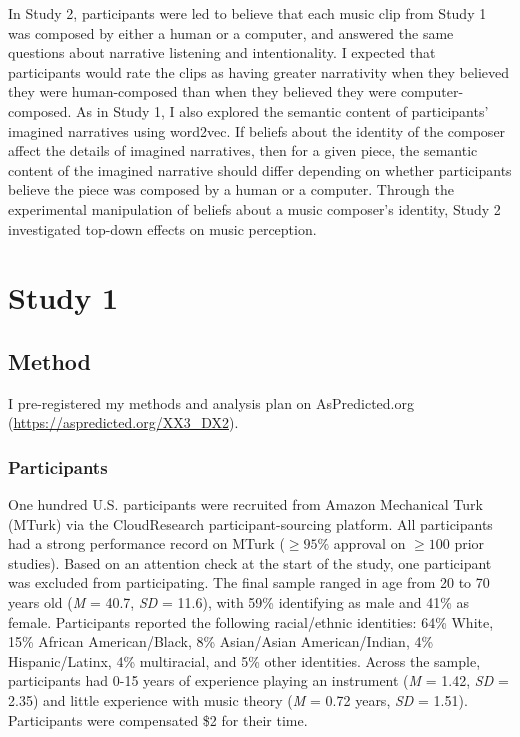 \documentclass[12pt,twoside]{reedthesis}
\begin{document}
In Study 2, participants were led to believe that each music clip from Study 1 was composed by either a human or a computer, and answered the same questions about narrative listening and intentionality. I expected that participants would rate the clips as having greater narrativity when they believed they were human-composed than when they believed they were computer-composed. As in Study 1, I also explored the semantic content of participants’ imagined narratives using word2vec. If beliefs about the identity of the composer affect the details of imagined narratives, then for a given piece, the semantic content of the imagined narrative should differ depending on whether participants believe the piece was composed by a human or a computer. Through the experimental manipulation of beliefs about a music composer’s identity, Study 2 investigated top-down effects on music perception.  

\chapter*{Study 1}

\section{Method}

I pre-registered my methods and analysis plan on AsPredicted.org (\url{https://aspredicted.org/XX3_DX2}).

\subsection{Participants}
One hundred U.S. participants were recruited from Amazon Mechanical Turk (MTurk) via the CloudResearch participant-sourcing platform. All participants had a strong performance record on MTurk ($\ge95\%$ approval on $\ge100$ prior studies). Based on an attention check at the start of the study, one participant was excluded from participating. The final sample ranged in age from 20 to 70 years old (\emph{M} = 40.7, \emph{SD} = 11.6), with 59\% identifying as male and 41\% as female. Participants reported the following racial/ethnic identities: 64\% White, 15\% African American/Black, 8\% Asian/Asian American/Indian, 4\% Hispanic/Latinx, 4\% multiracial, and 5\% other identities. Across the sample, participants had 0-15 years of experience playing an instrument (\emph{M} = 1.42, \emph{SD} = 2.35) and little experience with music theory (\emph{M} = 0.72 years, \emph{SD} = 1.51). Participants were compensated \$2 for their time. 
\end{document}

